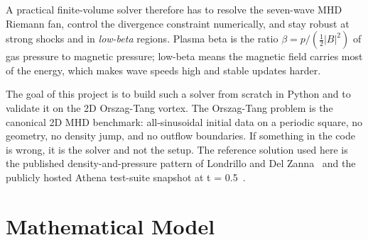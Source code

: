 \documentclass[11pt]{article}
\begin{document}
A practical finite-volume solver therefore has to resolve the seven-wave MHD Riemann fan, control the divergence constraint numerically, and stay robust at strong shocks and in \emph{low-beta} regions.  Plasma beta is the ratio $\beta = p / (\tfrac{1}{2}|B|^{2})$ of gas pressure to magnetic pressure; low-beta means the magnetic field carries most of the energy, which makes wave speeds high and stable updates harder.

The goal of this project is to build such a solver from scratch in Python and to validate it on the 2D Orszag-Tang vortex.  The Orszag-Tang problem is the canonical 2D MHD benchmark: all-sinusoidal initial data on a periodic square, no geometry, no density jump, and no outflow boundaries.  If something in the code is wrong, it is the solver and not the setup.  The reference solution used here is the published density-and-pressure pattern of Londrillo and Del Zanna~\cite{londrillo2000} and the publicly hosted Athena test-suite snapshot at t = 0.5~\cite{athena_orszag_tang}.

\section{Mathematical Model}
\end{document}
